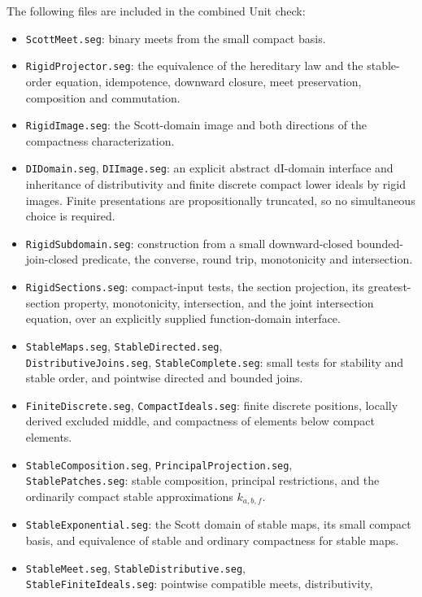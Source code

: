 \documentclass[11pt]{article}
\begin{document}
The following files are included in the combined Unit check:
\begin{itemize}
\item \texttt{ScottMeet.seg}: binary meets from the small compact basis.
\item \texttt{RigidProjector.seg}: the equivalence of the hereditary law
and the stable-order equation, idempotence, downward closure, meet
preservation, composition and commutation.
\item \texttt{RigidImage.seg}: the Scott-domain image and both directions
of the compactness characterization.
\item \texttt{DIDomain.seg}, \texttt{DIImage.seg}: an explicit abstract
dI-domain interface and inheritance of distributivity and finite
discrete compact lower ideals by rigid images. Finite presentations
are propositionally truncated, so no simultaneous choice is required.
\item \texttt{RigidSubdomain.seg}: construction from a small
downward-closed bounded-join-closed predicate, the converse, round trip,
monotonicity and intersection.
\item \texttt{RigidSections.seg}: compact-input tests, the section
projection, its greatest-section property, monotonicity, intersection,
and the joint intersection equation, over an explicitly supplied
function-domain interface.
\item \texttt{StableMaps.seg}, \texttt{StableDirected.seg},\\
\texttt{DistributiveJoins.seg}, \texttt{StableComplete.seg}: small tests
for stability and stable order, and pointwise directed and bounded joins.
\item \texttt{FiniteDiscrete.seg}, \texttt{CompactIdeals.seg}: finite
discrete positions, locally derived excluded middle, and compactness
of elements below compact elements.
\item \texttt{StableComposition.seg}, \texttt{PrincipalProjection.seg},\\
\texttt{StablePatches.seg}: stable composition, principal restrictions,
and the ordinarily compact stable approximations $k_{a,b,f}$.
\item \texttt{StableExponential.seg}: the Scott domain of stable maps,
its small compact basis, and equivalence of stable and ordinary
compactness for stable maps.
\item \texttt{StableMeet.seg}, \texttt{StableDistributive.seg},\\
\texttt{StableFiniteIdeals.seg}: pointwise compatible meets, distributivity,

\end{itemize}
\end{document}

